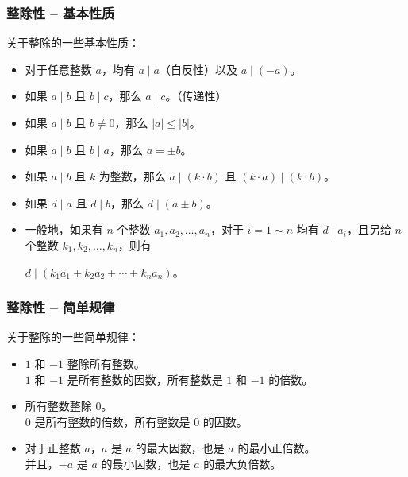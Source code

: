 \documentclass{../pkslide}
\begin{document}
\begin{frame}
  \frametitle{整除性 -- 基本性质}
  
  关于整除的一些基本性质：
  
  \begin{itemize}
    \setlength{\itemsep}{2pt}
    \item<2-> 对于任意整数 $a$，均有 $a \mid a$（自反性）以及 $a \mid (-a)$。
    \item<2-> 如果 $a \mid b$ 且 $b \mid c$，那么 $a \mid c$。（传递性）
    \item<3-> 如果 $a \mid b$ 且 $b \ne 0$，那么 $|a| \le |b|$。
    \item<3-> 如果 $a \mid b$ 且 $b \mid a$，那么 $a = \pm b$。
    \item<4-> 如果 $a \mid b$ 且 $k$ 为整数，那么 $a \mid (k \cdot b)$ 且 $(k \cdot a) \mid (k \cdot b)$。
    \item<4-> 如果 $d \mid a$ 且 $d \mid b$，那么 $d \mid (a \pm b)$。
    \item<5-> 一般地，如果有 $n$ 个整数 $a_1, a_2, \ldots, a_n$，对于 $i = 1 \sim n$ 均有 $d \mid a_i$，且另给 $n$ 个整数 $k_1, k_2, \ldots, k_n$，则有%
      \begin{center}
        $\displaystyle d \mid (k_1 a_1 + k_2 a_2 + \cdots + k_n a_n)$。
      \end{center}%
  \end{itemize}
\end{frame}

\begin{frame}
  \frametitle{整除性 -- 简单规律}
  
  关于整除的一些简单规律：
  
  \begin{itemize}
    \item<2-> $1$ 和 $-1$ 整除所有整数。\\
      $1$ 和 $-1$ 是所有整数的因数，所有整数是 $1$ 和 $-1$ 的倍数。
    \item<3-> 所有整数整除 $0$。\\
      $0$ 是所有整数的倍数，所有整数是 $0$ 的因数。
    \item<4-> 对于正整数 $a$，$a$ 是 $a$ 的最大因数，也是 $a$ 的最小正倍数。\\
      并且，$-a$ 是 $a$ 的最小因数，也是 $a$ 的最大负倍数。
  \end{itemize}
  
\end{frame}
\end{document}
